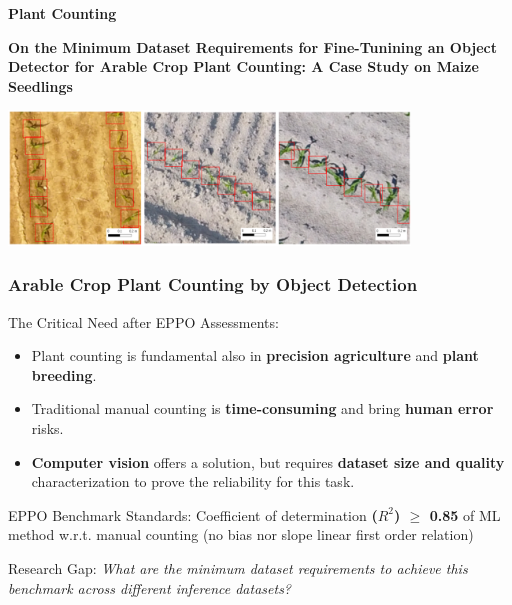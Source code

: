 \documentclass[aspectratio=43]{beamer}
\begin{document}
\begin{frame}
    \begin{center}
        \Huge \textbf{Plant Counting}
        \vspace{0.5cm}
        
        \Large \textbf{On the Minimum Dataset Requirements for Fine-Tunining an Object Detector for Arable Crop Plant Counting: A Case Study on Maize Seedlings}
        
        \vspace{1cm}
        \begin{center}
            \includegraphics[width=0.8\textwidth]{Imgs/dataset_example.png}
        \end{center}
    \end{center}
\end{frame}

\begin{frame}
    \frametitle{\small Arable Crop Plant Counting by Object Detection}
    
    \begin{block}{The Critical Need after EPPO Assessments:}
        \begin{itemize}
            \item Plant counting is fundamental also in \textbf{precision agriculture} and \textbf{plant breeding}.
            \item Traditional manual counting is \textbf{time-consuming} and bring \textbf{human error} risks.
            \item \textbf{Computer vision} offers a solution, but requires \textbf{dataset size and quality} characterization to prove the reliability for this task.
        \end{itemize}
    \end{block}
    
    \begin{exampleblock}{EPPO Benchmark Standards:}
        Coefficient of determination \textbf{($R^2$) $\geq$ 0.85} of ML method w.r.t. manual counting (no bias nor slope linear first order relation)
    \end{exampleblock}
    
    \begin{alertblock}{Research Gap:}
        \textit{What are the minimum dataset requirements to achieve this benchmark across different inference datasets?}
    \end{alertblock}
\end{frame}
\end{document}
